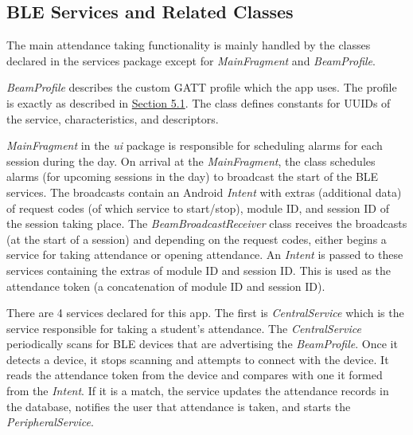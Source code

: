 \documentclass[../report.tex]{subfiles}
\begin{document}


\subsection{BLE Services and Related Classes}
The main attendance taking functionality is mainly handled by the classes declared in the services package except for \textit{MainFragment} and \textit{BeamProfile}.

\textit{BeamProfile} describes the custom GATT profile which the app uses. The profile is exactly as described in \hyperref[sec:gatt-profile]{Section 5.1}. The class defines constants for UUIDs of the service, characteristics, and descriptors.

\textit{MainFragment} in the \textit{ui} package is responsible for scheduling alarms for each session during the day. On arrival at the \textit{MainFragment}, the class schedules alarms (for upcoming sessions in the day) to broadcast the start of the BLE services. The broadcasts contain an Android \textit{Intent} with extras (additional data) of request codes (of which service to start/stop), module ID, and session ID of the session taking place. The \textit{BeamBroadcastReceiver} class receives the broadcasts (at the start of a session) and depending on the request codes, either begins a service for taking attendance or opening attendance. An \textit{Intent} is passed to these services containing the extras of module ID and session ID. This is used as the attendance token (a concatenation of module ID and session ID).



There are 4 services declared for this app. The first is \textit{CentralService} which is the service responsible for taking a student’s attendance. The \textit{CentralService} periodically scans for BLE devices that are advertising the \textit{BeamProfile}. Once it detects a device, it stops scanning and attempts to connect with the device. It reads the attendance token from the device and compares with one it formed from the \textit{Intent}. If it is a match, the service updates the attendance records in the database, notifies the user that attendance is taken, and starts the \textit{PeripheralService}.
\end{document}

